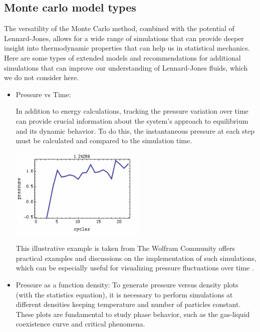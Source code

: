 \documentclass[a4paper,12pt]{article}
\begin{document}
\subsection{Monte carlo model types}
\begin{multicols}{2}

The versatility of the Monte Carlo method, combined with the potential of Lennard-Jones, allows for a wide range of simulations that can provide deeper insight into thermodynamic properties that can help us in statistical mechanics.
 Here are some types of extended models and recommendations for additional simulations that can improve our understanding of Lennard-Jones fluids, which we do not consider here.

 
\begin{itemize}
    \item Pressure vs Time:

In addition to energy calculations, tracking the pressure variation over time can provide crucial information about the system's approach to equilibrium and its dynamic behavior. 
To do this, the instantaneous pressure at each step must be calculated and compared to the simulation time. 

\begin{center}
\includegraphics[width=6.5cm]{images/16.png}
\end{center}
This illustrative example is taken from The Wolfram Community offers practical examples and discussions on the implementation of such simulations, which can be especially useful for visualizing pressure fluctuations over time \cite{wolfram_lj_fluid}. 
    \item  Pressure as a function density:
To generate pressure versus density plots (with the statistics equation), it is necessary to perform simulations at different densities keeping temperature and number of particles constant. These plots are fundamental to study phase behavior, such as the gas-liquid coexistence curve and critical phenomena.


\end{itemize}
\end{multicols}
\end{document}
